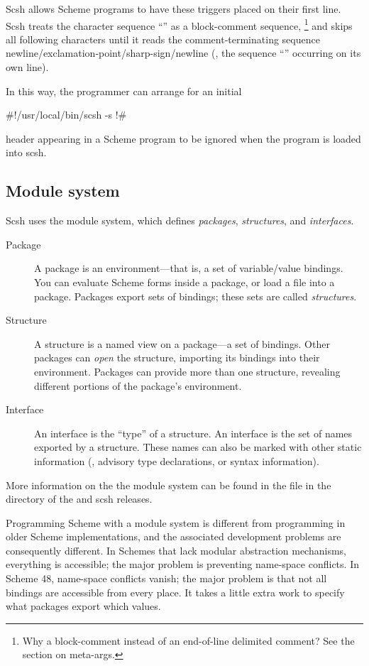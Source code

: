 Scsh allows Scheme programs to have these triggers placed on
their first line.
Scsh treats the character sequence ``\ex{\#!}'' as a block-comment sequence,%
\footnote{Why a block-comment instead of an end-of-line delimited comment?
          See the section on meta-args.}
and skips all following characters until it reads the comment-terminating
sequence newline/exclamation-point/sharp-sign/newline (\ie, the
sequence ``\ex{!\#}'' occurring on its own line).

In this way, the programmer can arrange for an initial
\begin{code}
#!/usr/local/bin/scsh -s
!#\end{code}
header appearing in a Scheme program
to be ignored when the program is loaded into scsh.

\subsection{Module system}
Scsh uses the {\scm} module system, which defines
\emph{packages}, \emph{structures}, and \emph{interfaces}.
%
\begin{description}

\item [Package] A package is an environment---that is, a set of
variable/value bindings.
You can evaluate Scheme forms inside a package, or load a file into a package.
Packages export sets of bindings; these sets are called \emph{structures}.

\item [Structure] A structure is a named view on a package---a set of
    bindings. Other packages can \emph{open} the structure, importing its
    bindings into their environment. Packages can provide more than one
    structure, revealing different portions of the package's environment.

\item [Interface] An interface is the ``type'' of a structure. An
    interface is the set of names exported by a structure. These names
    can also be marked with other static information (\eg, advisory type
    declarations, or syntax information).
\end{description}
More information on the the {\scm} module system can be found in the 
file  in the  directory of the {\scm} and scsh releases.

Programming Scheme with a module system is different from programming
in older Scheme implementations,
and the associated development problems are consequently different.
In Schemes that lack modular abstraction mechanisms, 
everything is accessible; the major problem is preventing name-space conflicts.
In Scheme 48, name-space conflicts vanish; the major problem is that not
all bindings are accessible from every place.
It takes a little extra work to specify what packages export which values.

